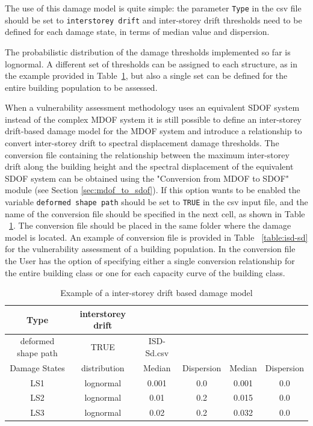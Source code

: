 The use of this damage model is quite simple: the parameter \verb=Type= in the csv file should be set to \verb=interstorey drift= and inter-storey drift thresholds need to be defined for each damage state, in terms of median value and dispersion.

The probabilistic distribution of the damage thresholds implemented so far is lognormal. A different set of thresholds can be assigned to each structure, as in the example provided in Table~\ref{table:isd-dmg}, but also a single set can be defined for the entire building population to be assessed.

When a vulnerability assessment methodology uses an equivalent SDOF system instead of the complex MDOF system it is still possible to define an inter-storey drift-based damage model for the MDOF system and introduce a relationship to convert inter-storey drift to spectral displacement damage thresholds. The conversion file containing the relationship between the maximum inter-storey drift along the building height and the spectral displacement of the equivalent SDOF system can be obtained using the "Conversion from MDOF to SDOF" module (see Section \ref{sec:mdof_to_sdof}). If this option wants to be enabled the variable \verb=deformed shape path= should be set to \verb=TRUE= in the csv input file, and the name of the conversion file should be specified in the next cell, as shown in Table ~\ref{table:isd-dmg}. The conversion file should be placed in the same folder where the damage model is located. An example of conversion file is provided in Table ~\ref{table:isd-sd} for the vulnerability assessment of a building population. In the conversion file the User has the option of specifying either a single conversion relationship for the entire building class or one for each capacity curve of the building class.

\begin {table}[htb]
\caption{Example of a inter-storey drift based damage model}
\label{table:isd-dmg}
\begin{center}
  \begin{tabular}{ | c | c | c | c | c | c |}
  \hline
    Type & interstorey drift &  &  & & \\ \hline
    deformed shape path & TRUE & ISD-Sd.csv  &  & & \\ \hline
    Damage States & distribution & Median & Dispersion & Median & Dispersion \\ \hline
    LS1 & lognormal & 0.001 & 0.0 & 0.001 & 0.0 \\ \hline
    LS2 & lognormal & 0.01  & 0.2 & 0.015 & 0.0 \\ \hline
    LS3 & lognormal & 0.02  & 0.2 & 0.032 & 0.0 \\ \hline
  \end{tabular}
\end{center}
\end{table}

